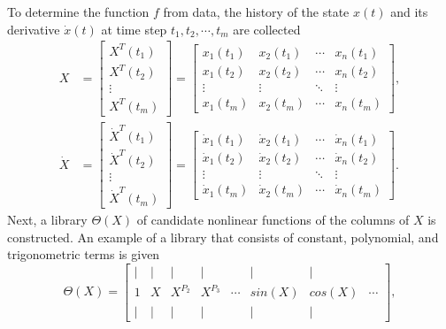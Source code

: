 To determine the function $f$ from data, the history of the state $x(t)$ and its derivative $\dot{x}(t)$ at time step $t_1, t_2, \cdots, t_m$ are collected \cite{bruntonDiscoveringGoverningEquations2016}
\begin{equation}
    \begin{aligned}
        X &=
        \begin{bmatrix}
            X^T(t_1) \\
            X^T(t_2) \\
            \vdots \\
            X^T(t_m)
        \end{bmatrix} =
        \begin{bmatrix}
            x_1(t_1) & x_2(t_1) & \cdots & x_n(t_1) \\
            x_1(t_2) & x_2(t_2) & \cdots & x_n(t_2) \\
            \vdots & \vdots & \ddots & \vdots \\
            x_1(t_m) & x_2(t_m) & \cdots & x_n(t_m)
        \end{bmatrix}, \\
        \dot{X} &=
        \begin{bmatrix}
            \dot{X}^T(t_1) \\
            \dot{X}^T(t_2) \\
            \vdots \\
            \dot{X}^T(t_m)
        \end{bmatrix} =
        \begin{bmatrix}
            \dot{x}_1(t_1) & \dot{x}_2(t_1) & \cdots & \dot{x}_n(t_1) \\
            \dot{x}_1(t_2) & \dot{x}_2(t_2) & \cdots & \dot{x}_n(t_2) \\
            \vdots & \vdots & \ddots & \vdots \\
            \dot{x}_1(t_m) & \dot{x}_2(t_m) & \cdots & \dot{x}_n(t_m)
        \end{bmatrix}.
    \end{aligned}
\end{equation}
Next, a library $\Theta(X)$ of candidate nonlinear functions of the columns of $X$ is constructed.
An example of a library that consists of constant, polynomial, and trigonometric terms is given \cite{bruntonDiscoveringGoverningEquations2016}
\begin{equation}
    \Theta(X) = \begin{bmatrix}
        | & | & |       & |       &        & |      & |      & \\
        1 & X & X^{P_2} & X^{P_3} & \cdots & sin(X) & cos(X) & \cdots \\
        | & | & |       & |       &        & |      & |      &
    \end{bmatrix},
\end{equation}

